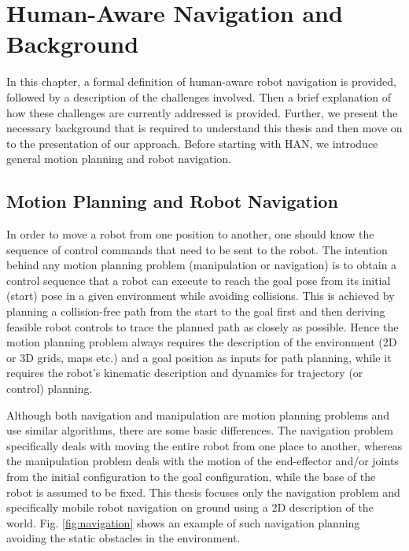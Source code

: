 \ifdefined{}
\else
\setcounter{chapter}{0}
\dominitoc
\faketableofcontents
\fi

\chapter{Human-Aware Navigation and Background}
\label{chap:1}
\minitoc

In this chapter, a formal definition of human-aware robot navigation is provided, followed by a description of the challenges involved. Then a brief explanation of how these challenges are currently addressed is provided. Further, we present the necessary background that is required to understand this thesis and then move on to the presentation of our approach. Before starting with HAN, we introduce general motion planning and robot navigation.

\section{Motion Planning and Robot Navigation}
In order to move a robot from one position to another, one should know the sequence of control commands that need to be sent to the robot. The intention behind any motion planning problem (manipulation or navigation) is to obtain a control sequence that a robot can execute to reach the goal pose from its initial (start) pose in a given environment while avoiding collisions. This is achieved by planning a collision-free path from the start to the goal first and then deriving feasible robot controls to trace the planned path as closely as possible. Hence the motion planning problem always requires the description of the environment (2D or 3D grids, maps etc.) and a goal position as inputs for path planning, while it requires the robot's kinematic description and dynamics for trajectory (or control) planning.  

Although both navigation and manipulation are motion planning problems and use similar algorithms, there are some basic differences. The navigation problem specifically deals with moving the entire robot from one place to another, whereas the manipulation problem deals with the motion of the end-effector and/or joints from the initial configuration to the goal configuration, while the base of the robot is assumed to be fixed. This thesis focuses only the navigation problem and specifically mobile robot navigation on ground using a 2D description of the world. Fig. \ref{fig:navigation} shows an example of such navigation planning avoiding the static obstacles in the environment.

